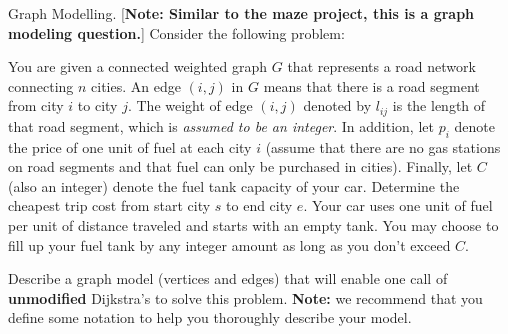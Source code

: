 \documentclass[12pt]{exam}
\newcommand{\stars}[1]{%
    \foreach \n in {1,...,#1}{%
        $\filledstar$%
    }%
}
\begin{document}
\begin{questions}

\question[30] [W6, \stars{5}] Graph Modelling. [{\bf Note: Similar to the maze project, this is a graph modeling question.}] Consider the following problem:

\begin{mdframed}
    You are given a connected weighted graph $G$ that represents a road network connecting $n$ cities. An edge $(i,j)$ in $G$ means that there is a road segment from city $i$ to city $j$. The weight of edge $(i,j)$ denoted by $l_{ij}$ is the length of that road segment, which is {\em assumed to be an integer}. In addition, let $p_i$ denote the price of one unit of fuel at each city $i$ (assume that there are no gas stations on road segments and that fuel can only be purchased in cities). Finally, let $C$ (also an integer) denote the fuel tank capacity of your car. Determine the cheapest trip cost from start city $s$ to end city $e$. Your car uses one unit of fuel per unit of distance traveled and starts with an empty tank. You may choose to fill up your fuel tank by any integer amount as long as you don't exceed $C$.
\end{mdframed}

Describe a graph model (vertices and edges) that will enable one call of \textbf{unmodified} Dijkstra's to solve this problem. \textbf{Note:} we recommend that you define some notation to help you thoroughly describe your model.

\end{questions}
\end{document}
